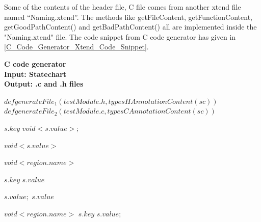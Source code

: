 Some of the contents of the header file, C file comes from another xtend file named \enquote{Naming.xtend}. The methods like getFileContent, getFunctionContent, getGoodPathContent() and getBadPathContent() all are implemented inside the "Naming.xtend" file. The code snippet from C code generator has given in \ref{C_Code_Generator_Xtend_Code_Snippet}.
\begin{algorithm}
	\label{Algorithm:C_Code_Generator}
	{\textbf{C code generator}}\\
	\noindent\makebox[\linewidth]{\rule{\textwidth}{0.4pt}}
	{\textbf{Input: Statechart}} \\
	{\textbf{Output: .c and .h files}}
	\begin{algorithmic}[1]
	
		
			\State $def {generateFile_1} (testModule.h, typesHAnnotationContent(sc)) $ 
			\State $def {generateFile_2} (testModule.c, typesCAnnotationContent(sc)) $  
		\EndFunction
		
					\State $s.key$
					\State $ void <s.value>;$
				\EndIf		
			\EndFor			
		\EndFunction
		
		
				\State $void <s.value> {}$
			\EndIf		
		\EndFor
			
			\State $void <region.name>$
				
					
							\State $s.key$
							\State $s.value$
						\EndIf
					
							\State $s.value;$
							\State $s.value$
						\EndIf
					
					\EndFor 
			\EndIf
		
			\State $void <region.name>$
						\State $s.key$						
					\EndIf
					\State $s.value;$
				\EndFor 
			\EndIf
				
		\EndFor
				
		\EndFunction
		
		
	\end{algorithmic}
	\noindent\makebox[\linewidth]{\rule{\textwidth}{0.4pt}}
\end{algorithm}

